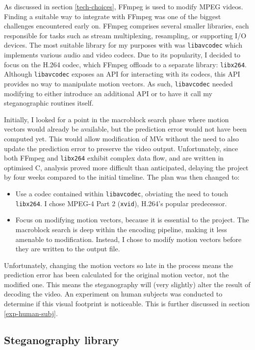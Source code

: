 \documentclass[12pt,british,twoside,notitlepage,usenames,dvipsnames,hypens,final]{report}
\numberwithin{equation}{section}
\numberwithin{figure}{section}
\begin{document}
As discussed in section \ref{tech-choices}, FFmpeg is used to modify MPEG videos. Finding a suitable way to integrate with FFmpeg was one of the biggest challenges encountered early on. FFmpeg comprises several smaller libraries, each responsible for tasks such as stream multiplexing, resampling, or supporting I/O devices. The most suitable library for my purposes with was \texttt{libavcodec} which implements various audio and video codecs. Due to its popularity, I decided to focus on the H.264 codec, which FFmpeg offloads to a separate library: \texttt{libx264}. Although \texttt{libavcodec} exposes an API for interacting with its codecs, this API provides no way to manipulate motion vectors. As such, \texttt{libavcodec} needed modifying to either introduce an additional API or to have it call my steganographic routines itself.

Initially, I looked for a point in the macroblock search phase where motion vectors would already be available, but the prediction error would not have been computed yet. This would allow modification of MVs without the need to also update the prediction error to preserve the video output. Unfortunately, since both FFmpeg and \texttt{libx264} exhibit complex data flow, and are written in optimised C, analysis proved more difficult than anticipated, delaying the project by four weeks compared to the initial timeline. The plan was then changed to:
\begin{itemize}
\item Use a codec contained within \texttt{libavcodec}, obviating the need to touch \texttt{libx264}. I chose MPEG-4 Part 2 (\texttt{xvid}), H.264's popular predecessor.
\item Focus on modifying motion vectors, because it is essential to the project. The macroblock search is deep within the encoding pipeline, making it less amenable to modification. Instead, I chose to modify motion vectors before they are written to the output file.
\end{itemize}

Unfortunately, changing the motion vectors so late in the process means the prediction error has been calculated for the original motion vector, not the modified one. This means the steganography will (very slightly) alter the result of decoding the video. An experiment on human subjects was conducted to determine if this visual footprint is noticeable. This is further discussed in section \ref{exp-human-subj}.

\subsection{Steganography library}
\end{document}

